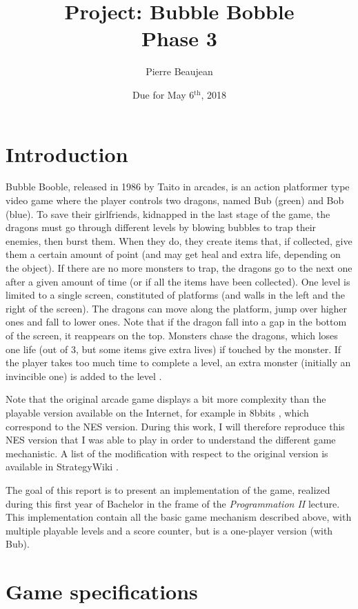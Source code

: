 \documentclass[12pt,a4paper]{article}
\title{Project: Bubble Bobble\\Phase 3}
\author{Pierre Beaujean}
\date{Due for May 6$^\text{th}$, 2018}
\begin{document}
\maketitle

\section{Introduction}

Bubble Booble, released in 1986 by Taito in arcades, is an action platformer type video game where the player controls two dragons, named Bub (green) and Bob (blue). To save their girlfriends, kidnapped in the last stage of the game, the dragons must go through different levels by blowing bubbles to trap their enemies, then burst them. When they do, they create items that, if collected, give them a certain amount of point (and may get heal and extra life, depending on the object). If there are no more monsters to trap, the dragons go to the next one after a given amount of time (or if all the items have been collected). One level is limited to a single screen, constituted of platforms (and walls in the left and the right of the screen). The dragons can move along the platform, jump over higher ones and fall to lower ones. Note that if the dragon fall into a gap in the bottom of the screen, it reappears on the top. Monsters chase the dragons, which loses one life (out of 3, but some items give extra lives) if touched by the monster. If the player takes too much time to complete a level, an extra monster (initially an invincible one) is added to the level \cite{wikibub,wikibub2}.

Note that the original arcade game displays a bit more complexity than the playable version available on the Internet, for example in 8bbits \cite{playbub}, which correspond to the NES version. During this work, I will therefore reproduce this NES version that I was able to play in order to understand the different game mechanistic. A list of the modification with respect to the original version is available in StrategyWiki \cite{wikibub2_nes}.

The goal of this report is to present an implementation of the game, realized during this first year of Bachelor in the frame of the \textit{Programmation II} lecture. This implementation contain all the basic game mechanism described above, with multiple playable levels and a score counter, but is a one-player version (with Bub).

\section{Game specifications}
\end{document}
